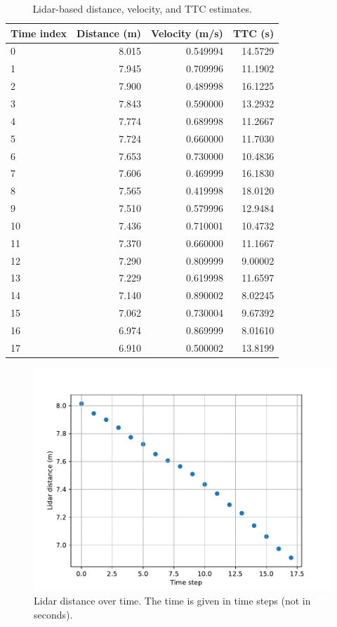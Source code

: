 \documentclass[a4paper]{scrartcl}
\begin{document}
\begin{table}
	\centering
	\caption{Lidar-based distance, velocity, and TTC estimates.}
	\label{tab:lidar_estimates}
	\begin{tabular}{l|rrr}
Time index & Distance (m) & Velocity (m/s) & TTC (s) \\ \hline
0       & 8.015 & 0.549994  & 14.5729 \\
1       & 7.945 & 0.709996  & 11.1902 \\
2       & 7.900 & 0.489998  & 16.1225 \\
3       & 7.843 & 0.590000  & 13.2932 \\
4       & 7.774 & 0.689998  & 11.2667 \\
5       & 7.724 & 0.660000  & 11.7030 \\
6       & 7.653 & 0.730000  & 10.4836 \\
7       & 7.606 & 0.469999  & 16.1830 \\
8       & 7.565 & 0.419998  & 18.0120 \\
9       & 7.510 & 0.579996  & 12.9484 \\
10      & 7.436 & 0.710001  & 10.4732 \\
11      & 7.370 & 0.660000  & 11.1667 \\
12      & 7.290 & 0.809999  & 9.00002 \\
13      & 7.229 & 0.619998  & 11.6597 \\
14      & 7.140 & 0.890002  & 8.02245 \\
15      & 7.062 & 0.730004  & 9.67392 \\
16      & 6.974 & 0.869999  & 8.01610 \\
17      & 6.910 & 0.500002  & 13.8199
	\end{tabular}
\end{table}

\begin{figure}
	\centering
	\includegraphics[width=0.8\columnwidth]{./img/lidar_distances}
	\caption{Lidar distance over time. The time is given in time steps
			(not in seconds).}
	\label{fig:lidar_distances}
\end{figure}
\end{document}
